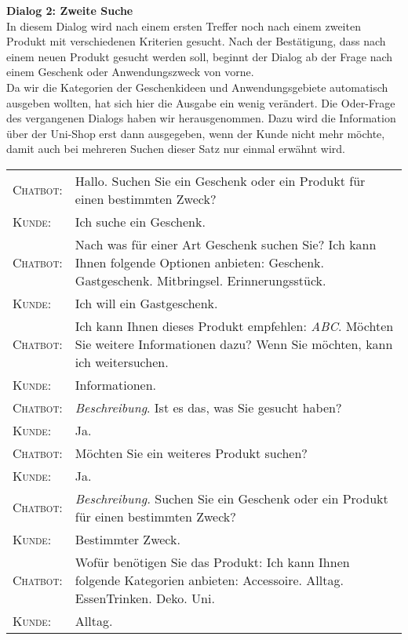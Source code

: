 \Large\textbf{Dialog 2: Zweite Suche}\\
\normalsize
In diesem Dialog wird nach einem ersten Treffer noch nach einem zweiten Produkt mit verschiedenen Kriterien gesucht. Nach der Bestätigung, dass nach einem neuen Produkt gesucht werden soll, beginnt der Dialog ab der Frage nach einem Geschenk oder Anwendungszweck von vorne.\\
Da wir die Kategorien der Geschenkideen und Anwendungsgebiete automatisch ausgeben wollten, hat sich hier die Ausgabe ein wenig verändert. Die Oder-Frage des vergangenen Dialogs haben wir herausgenommen. Dazu wird die Information über der Uni-Shop erst dann ausgegeben, wenn der Kunde nicht mehr möchte, damit auch bei mehreren Suchen dieser Satz nur einmal erwähnt wird.
\vspace{8pt}
\begin{center}
\begin{tabular}{p{}p{}}
	\textsc{Chatbot:} & Hallo. Suchen Sie ein Geschenk oder ein Produkt für einen bestimmten Zweck? \\
	\textsc{Kunde:} & Ich suche ein Geschenk.\\
	\textsc{Chatbot:} & Nach was für einer Art Geschenk suchen Sie? Ich kann Ihnen folgende Optionen anbieten: Geschenk. Gastgeschenk. Mitbringsel. Erinnerungsstück.\\
	\textsc{Kunde:} & Ich will ein Gastgeschenk. \\
	\textsc{Chatbot:} & Ich kann Ihnen dieses Produkt empfehlen: \textit{ABC}. Möchten Sie weitere Informationen dazu? Wenn Sie möchten, kann ich weitersuchen. \\
	\textsc{Kunde:} & Informationen. \\
	\textsc{Chatbot:} & \textit{Beschreibung}. Ist es das, was Sie gesucht haben?\\
	\textsc{Kunde:} & Ja. \\
	\textsc{Chatbot:} & Möchten Sie ein weiteres Produkt suchen? \\
	\textsc{Kunde:} & Ja. \\
	\textsc{Chatbot:} & \textit{Beschreibung.} Suchen Sie ein Geschenk oder ein Produkt für einen bestimmten Zweck?\\
	\textsc{Kunde:} & Bestimmter Zweck. \\
	\textsc{Chatbot:} & Wofür benötigen Sie das Produkt: Ich kann Ihnen folgende Kategorien anbieten: Accessoire. Alltag. EssenTrinken. Deko. Uni. \\
	\textsc{Kunde:} &  Alltag.\\

\end{tabular}
\end{center}
